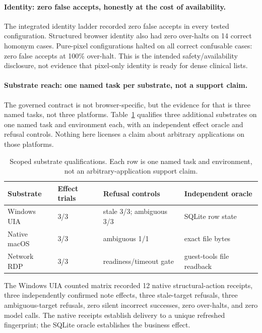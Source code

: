\paragraph{Identity: zero false accepts, honestly at the cost of availability.}
The integrated identity ladder recorded zero false accepts in every tested
configuration. Structured browser identity also had zero over-halts on 14
correct homonym cases. Pure-pixel configurations halted on all correct
confusable cases: zero false accepts at 100\% over-halt. This is the intended
safety/availability disclosure, not evidence that pixel-only identity is ready
for dense clinical lists.

\paragraph{Substrate reach: one named task per substrate, not a support claim.}
The governed contract is not browser-specific, but the evidence for that is
three named tasks, not three platforms. Table~\ref{tab:substrates}
qualifies three additional substrates on one named task and environment each,
with an independent effect oracle and refusal controls. Nothing here licenses a
claim about arbitrary applications on those platforms.

\begin{table}[t]
\centering
\caption{Scoped substrate qualifications. Each row is one named task and
environment, not an arbitrary-application support claim.}
\label{tab:substrates}
\begin{tabular}{llll}
\toprule
Substrate & Effect trials & Refusal controls & Independent oracle \\
\midrule
Windows UIA & 3/3 & stale 3/3; ambiguous 3/3 & SQLite row state \\
Native macOS & 3/3 & ambiguous 1/1 & exact file bytes \\
Network RDP & 3/3 & readiness/timeout gate & guest-tools file readback \\
\bottomrule
\end{tabular}
\end{table}

The Windows UIA counted matrix recorded 12 native structural-action receipts,
three independently confirmed note effects, three stale-target refusals, three
ambiguous-target refusals, zero silent incorrect successes, zero over-halts, and
zero model calls. The native receipts establish delivery to a unique refreshed
fingerprint; the SQLite oracle establishes the business effect.

